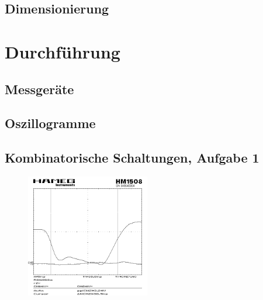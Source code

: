 \documentclass[numbers=noenddot,12pt,a4paper]{scrartcl}
\begin{document}
\subsection{Dimensionierung}
\section{Durchführung}
\subsection{Messgeräte}
\subsection{Oszillogramme}
\subsection{Kombinatorische Schaltungen, Aufgabe 1}
\begin{figure}[H]
\centering
\includegraphics[width=0.48\textwidth]{SCR00018.png}
\end{figure}
\end{document}
